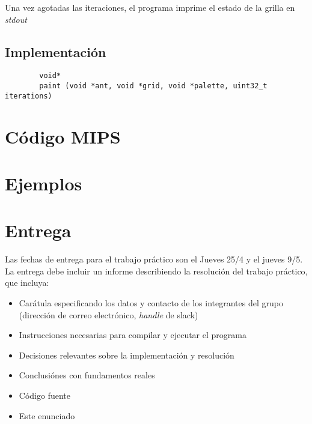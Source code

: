 \documentclass{article}
\begin{document}
Una vez agotadas las iteraciones, el programa imprime el estado de la grilla en \textit{stdout}

\subsection{Implementación}

\begin{verbatim}
        void*
        paint (void *ant, void *grid, void *palette, uint32_t iterations)
\end{verbatim}

\section{Código MIPS}

\section{Ejemplos}

\section{Entrega}

Las fechas de entrega para el trabajo práctico son el Jueves 25/4 y el jueves 9/5. La entrega debe incluir un informe
describiendo la resolución del trabajo práctico, que incluya:

\begin{itemize}
\item Carátula especificando los datos y contacto de los integrantes del grupo (dirección de correo electrónico, \textit{handle} de slack)
\item Instrucciones necesarias para compilar y ejecutar el programa
\item Decisiones relevantes sobre la implementación y resolución
\item Conclusiónes con fundamentos reales
\item Código fuente
\item Este enunciado
\end{itemize}
\end{document}
